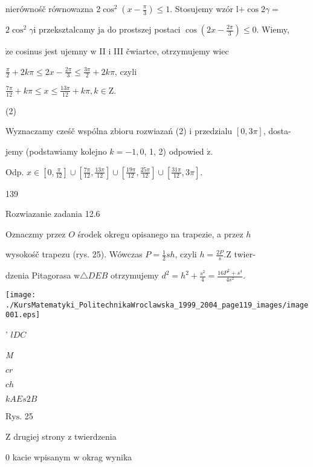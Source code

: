 \documentclass[a4paper,12pt]{article}
\begin{document}
nierównośč równowazna 2$\displaystyle \cos^{2}(x-\frac{\pi}{3}) \leq 1$. Stosujemy wzór l$+ \cos 2\gamma=$

$2\cos^{2}\gamma \mathrm{i}$ przeksztalcamy $\mathrm{j}\mathrm{a}$ do prostszej postaci $\displaystyle \cos(2x-\frac{2\pi}{3}) \leq 0$. Wiemy,

$\dot{\mathrm{z}}\mathrm{e}$ cosinus jest ujemny $\mathrm{w}$ II $\mathrm{i}$ III čwiartce, otrzymujemy wiec

$\displaystyle \frac{\pi}{2}+2k\pi\leq 2x-\frac{2\pi}{3}\leq\frac{3\pi}{2}+2k\pi$, czyli

$\displaystyle \frac{7\pi}{12}+k\pi\leq x\leq\frac{13\pi}{12}+k\pi, k\in \mathrm{Z}.$

(2)

Wyznaczamy cześč wspólna zbioru rozwiazań (2) $\mathrm{i}$ przedzialu $[0,3\pi]$, dosta-

jemy (podstawiamy kolejno $k=-1, 0$, 1, 2) odpowied $\acute{\mathrm{z}}.$

Odp. $ x\in [0,\displaystyle \frac{\pi}{12}]\cup [\displaystyle \frac{7\pi}{12},\frac{13\pi}{12}]\cup [\displaystyle \frac{19\pi}{12},\frac{25\pi}{12}]\cup [\displaystyle \frac{31\pi}{12},3\pi].$





139

Rozwiazanie zadania 12.6

Oznaczmy przez $O$ środek okregu opisanego na trapezie, a przez $h$

wysokośč trapezu (rys. 25). Wówczas $P= \displaystyle \frac{1}{2}sh$, czyli $h= \displaystyle \frac{2P}{s}. \mathrm{Z}$ twier-

dzenia Pitagorasa $\mathrm{w} \triangle DEB$ otrzymujemy $d^{2}=h^{2}+\displaystyle \frac{s^{2}}{4}=\frac{16P^{2}+s^{4}}{4s^{2}}.$
\begin{center}
\texttt{[image: ./KursMatematyki\_PolitechnikaWroclawska\_1999\_2004\_page119\_images/image001.eps]}
\end{center}
' $l D C$

{\it M}

$c r$

$c h$

$kA E s 2 B$

$\mathrm{R}\mathrm{y}\mathrm{s}$. 25

Z drugiej strony $\mathrm{z}$ twierdzenia

$0$ kacie wpisanym $\mathrm{w}$ okrag wynika
\end{document}
